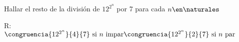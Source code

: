\ejercicio
Hallar el resto de la división de $12^{2^n}$ por 7 para cada $n \en \naturales$

\separadorCorto

R:\\
$
\congruencia{12^{2^n}}{4}{7} \text{ si } n \text{ impar}\\
\congruencia{12^{2^n}}{2}{7} \text{ si } n \text{ par}\\
$


